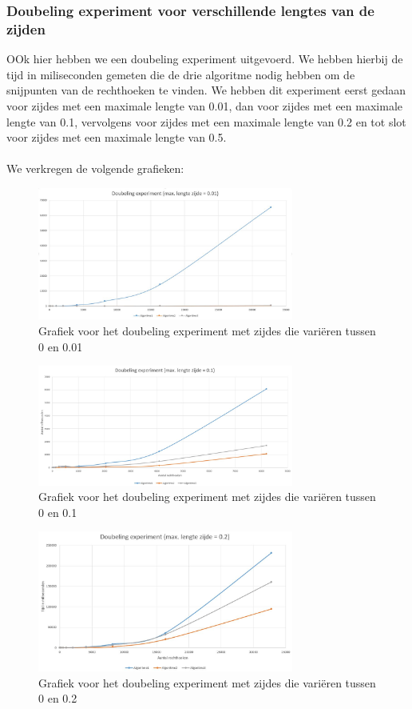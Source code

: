 \documentclass[11pt,a4paper,titlepage]{article}
\begin{document}
			\subsubsection{Doubeling experiment voor verschillende lengtes van de zijden}
				OOk hier hebben we een doubeling experiment uitgevoerd.  We hebben hierbij de tijd in miliseconden gemeten die de drie algoritme nodig hebben om de snijpunten van de rechthoeken te vinden. We hebben dit experiment eerst gedaan voor zijdes met een maximale lengte van 0.01, dan voor zijdes met een maximale lengte van 0.1, vervolgens voor zijdes met een maximale lengte van 0.2 en tot slot voor zijdes met een maximale lengte van 0.5.\\ \\
				We verkregen de volgende grafieken:
				\begin{figure}[H]
				\centering
				\includegraphics[width=0.75\textwidth]{zijde001.JPG}
				\caption{\label{fig:convR}Grafiek voor het doubeling experiment met zijdes die variëren tussen 0 en 0.01}
				\end{figure}
				\begin{figure}[H]
				\centering
				\includegraphics[width=0.75\textwidth]{zijde01.JPG}
				\caption{\label{fig:convR}Grafiek voor het doubeling experiment met zijdes die variëren tussen 0 en 0.1}
				\end{figure}
				\begin{figure}[H]
				\centering
				\includegraphics[width=0.75\textwidth]{zijde02.JPG}
				\caption{\label{fig:convR}Grafiek voor het doubeling experiment met zijdes die variëren tussen 0 en 0.2}
				\end{figure}
\end{document}
